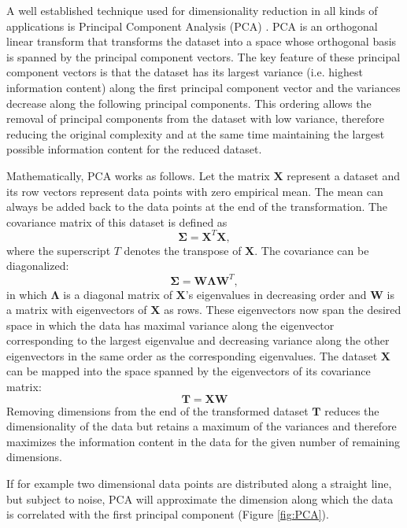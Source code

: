 \documentclass[english, a4paper, 12pt, titlepage, draft]{article}
\newcommand{\vect}[1]{\mathbf{#1}}
\begin{document}
A well established technique used for dimensionality reduction in all kinds of applications is Principal Component Analysis (PCA) \cite{PCAoriginal} \cite{PCA}.
PCA is an orthogonal linear transform that transforms the dataset into a space whose orthogonal basis is spanned by the principal component vectors.
The key feature of these principal component vectors is that the dataset has its largest variance (i.e. highest information content) along the first principal component vector and the variances decrease along the following principal components.
This ordering allows the removal of principal components from the dataset with low variance, therefore reducing the original complexity and at the same time maintaining the largest possible information content for the reduced dataset.

Mathematically, PCA works as follows.
Let the matrix $\vect{X}$ represent a dataset and its row vectors represent data points with zero empirical mean.
The mean can always be added back to the data points at the end of the transformation.
The covariance matrix of this dataset is defined as
\begin{equation}
    \vect{\Sigma} = \vect{X}^{T} \vect{X},
\end{equation}
where the superscript $T$ denotes the transpose of $\vect{X}$.
The covariance can be diagonalized:
\begin{equation}
    \vect{\Sigma} = \vect{W} \vect{\Lambda} \vect{W}^{T},
\end{equation}
in which $\vect{\Lambda}$ is a diagonal matrix of $\vect{X}$'s eigenvalues in decreasing order and $\vect{W}$ is a matrix with eigenvectors of $\vect{X}$ as rows.
These eigenvectors now span the desired space in which the data has maximal variance along the eigenvector corresponding to the largest eigenvalue and decreasing variance along the other eigenvectors in the same order as the corresponding eigenvalues.
The dataset $\vect{X}$ can be mapped into the space spanned by the eigenvectors of its covariance matrix:
\begin{equation}
    \vect{T} = \vect{X} \vect{W}
\end{equation}
Removing dimensions from the end of the transformed dataset $\vect{T}$ reduces the dimensionality of the data but retains a maximum of the variances and therefore maximizes the information content in the data for the given number of remaining dimensions.

If for example two dimensional data points are distributed along a straight line, but subject to noise, PCA will approximate the dimension along which the data is correlated with the first principal component (Figure \ref{fig:PCA}).
\end{document}
